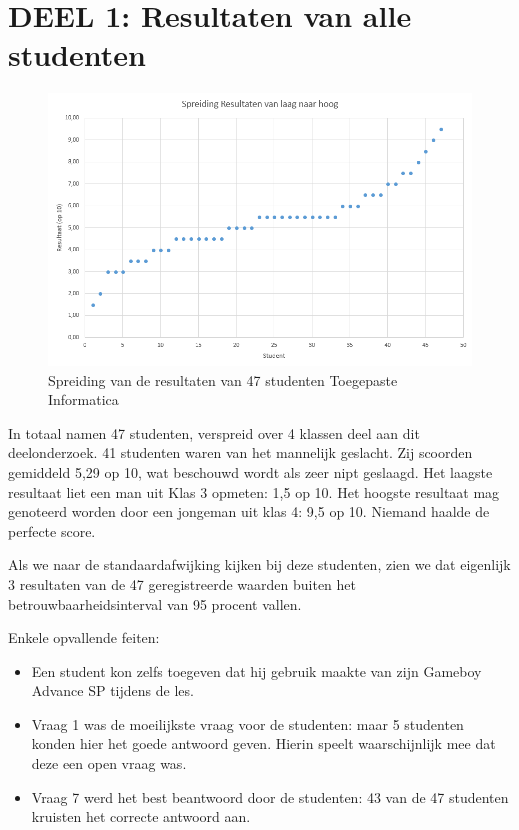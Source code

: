 \section{DEEL 1: Resultaten van alle studenten}
\label{sec:vragen_res1}

\begin{figure}
	\includegraphics[width=\textwidth]
	{img/spreiding-resultaten.PNG}
	\caption{Spreiding van de resultaten van 47 studenten Toegepaste Informatica}
	\label{fig:spreiding-vragen}
\end{figure}

In totaal namen 47 studenten, verspreid over 4 klassen deel aan dit deelonderzoek. 41 studenten waren van het mannelijk geslacht. Zij scoorden gemiddeld 5,29 op 10, wat beschouwd wordt als zeer nipt geslaagd. Het laagste resultaat liet een man uit Klas 3 opmeten: 1,5 op 10. Het hoogste resultaat mag genoteerd worden door een jongeman uit klas 4: 9,5 op 10. Niemand haalde de perfecte score.

Als we naar de standaardafwijking kijken bij deze studenten, zien we dat eigenlijk 3 resultaten van de 47 geregistreerde waarden buiten het betrouwbaarheidsinterval van 95 procent vallen. 

Enkele opvallende feiten:
\begin{itemize}
	\item Een student kon zelfs toegeven dat hij gebruik maakte van zijn Gameboy Advance SP tijdens de les.
	\item Vraag 1 was de moeilijkste vraag voor de studenten: maar 5 studenten konden hier het goede antwoord geven. Hierin speelt waarschijnlijk mee dat deze een open vraag was.
	\item Vraag 7 werd het best beantwoord door de studenten: 43 van de 47 studenten kruisten het correcte antwoord aan.
\end{itemize}


